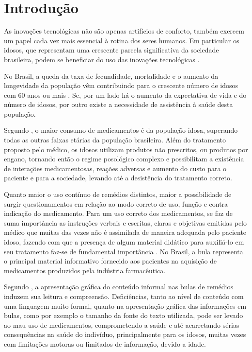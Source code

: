 \chapter{Introdução}\label{ch:intro}

As inovações tecnológicas não são apenas artifícios de conforto, também exercem um papel cada vez mais essencial à rotina dos seres humanos. Em particular os idosos, que representam uma crescente parcela significativa da sociedade brasileira, podem se beneficiar do uso das inovações tecnológicas \cite{Goncalves2011}. 

 No Brasil, a queda da taxa de fecundidade, mortalidade e o aumento da longevidade da população vêm contribuindo para o crescente número de idosos com 60 anos ou mais \cite{IBGE2013}. Se, por um lado há o aumento da expectativa de vida e do número de idosos, por outro existe a necessidade de assistência à saúde desta população.
 
 Segundo , o maior consumo de medicamentos é da população idosa, superando todas as outras faixas etárias da população brasileira. Além do tratamento proposto pelo médico, os idosos utilizam produtos não prescritos, ou produtos por engano, tornando então o regime posológico complexo e possibilitam a existência de interações medicamentosas, reações adversas e aumento do custo para o paciente e para a sociedade, levando até a desistência do tratamento correto.
 

Quanto maior o uso contínuo de remédios distintos, maior a possibilidade de surgir questionamentos em relação ao modo correto de uso, função e contra indicação do medicamento. Para um uso correto dos medicamentos, se faz de suma importância as instruções verbais e escritas, claras e objetivas  emitidas pelo médico que muitas das vezes não é assimilada de maneira adequada pelo paciente idoso, fazendo com que a presença de algum material didático para auxiliá-lo em seu tratamento faz-se de fundamental importância \cite{Didonet2007}. No Brasil, a bula representa o principal material informativo fornecido aos pacientes na aquisição de medicamentos produzidos pela indústria farmacêutica.

Segundo , a apresentação gráfica do conteúdo informal nas bulas de remédios induzem sua leitura e compreensão. Deficiências, tanto ao nível de conteúdo com uma linguagem muito formal, quanto na apresentação gráfica das informações em bulas, como por exemplo o tamanho da fonte do texto utilizada, pode ser levado ao mau uso de medicamentos, comprometendo a saúde e até acarretando sérias consequências na saúde do indivíduo, principalmente para os idosos, muitas vezes com limitações motoras ou limitados de informação, devido a idade. 



